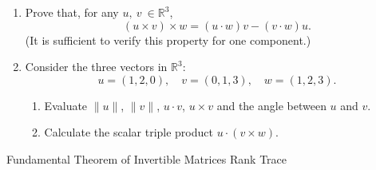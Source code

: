 \documentclass[12pt,a4paper]{article}
\begin{document}
	\begin{enumerate}
		\item Prove that, for any $u,\:v\:\in\mathbb{R}^3$, %
		$$(u\times v)\times w= (u\cdot w)v - (v\cdot w)u.$$
		(It is sufficient to verify this property for one component.)
		\item
		Consider the three vectors in $\mathbb{R}^3$:
		$$
		u = (1, 2, 0), \quad v = (0, 1, 3),\quad w = (1, 2, 3).
		$$
		\begin{enumerate}
			\item  Evaluate $\|u\|$, $\|v\|$, $u\cdot v$, $u\times v$ and the angle between $u$ and $v$. %
			
			\medskip\item Calculate the scalar triple product  $u\cdot(v \times w)$.%
		\end{enumerate}
	\end{enumerate}
	
	Fundamental Theorem of Invertible Matrices
	Rank
	Trace
	
	
	
	
	

	
\end{document}
